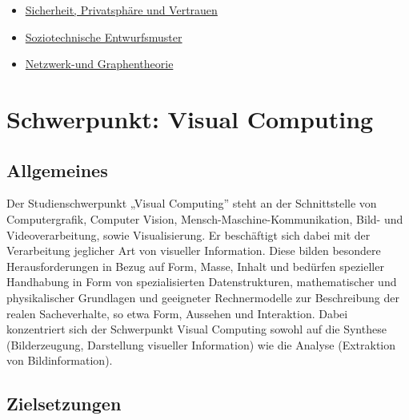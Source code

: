 \begin{itemize}
\tightlist
\item
  \hyperref[/mi-2017/modulbeschreibungen-master/MA_WTW_Modul_IT-Sicherheit]{Sicherheit,
  Privatsphäre und Vertrauen}
\item
  \hyperref[/mi-2017/modulbeschreibungen-master/MA_SC_Soziotechnische_Entwurfsmuster]{Soziotechnische
  Entwurfsmuster}
\item
  \hyperref[/mi-2017/modulbeschreibungen-master/MA_SC_Modul_Netzwerk--und-Graphentheorie]{Netzwerk-und
  Graphentheorie}
\end{itemize}

\chapter{Schwerpunkt: Visual
Computing\label{/mi-2017/modulbeschreibungen-master/schwerpunkt-visual-computing}}\label{schwerpunkt-visual-computingpathlabelmi-2017modulbeschreibungen-masterschwerpunkt-visual-computing}

\section*{Allgemeines\label{/mi-2017/modulbeschreibungen-master/schwerpunkt-visual-computing}}\label{allgemeinespathlabelmi-2017modulbeschreibungen-masterschwerpunkt-visual-computing}

Der Studienschwerpunkt „Visual Computing'' steht an der Schnittstelle
von Computergrafik, Computer Vision, Mensch-Maschine-Kommunikation,
Bild- und Videoverarbeitung, sowie Visualisierung. Er beschäftigt sich
dabei mit der Verarbeitung jeglicher Art von visueller Information.
Diese bilden besondere Herausforderungen in Bezug auf Form, Masse,
Inhalt und bedürfen spezieller Handhabung in Form von spezialisierten
Datenstrukturen, mathematischer und physikalischer Grundlagen und
geeigneter Rechnermodelle zur Beschreibung der realen Sacheverhalte, so
etwa Form, Aussehen und Interaktion. Dabei konzentriert sich der
Schwerpunkt Visual Computing sowohl auf die Synthese (Bilderzeugung,
Darstellung visueller Information) wie die Analyse (Extraktion von
Bildinformation).

\section*{Zielsetzungen\label{/mi-2017/modulbeschreibungen-master/schwerpunkt-visual-computing}}\label{zielsetzungenpathlabelmi-2017modulbeschreibungen-masterschwerpunkt-visual-computing}

